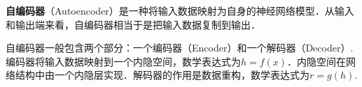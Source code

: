 
\textbf{自编码器}（Autoencoder）是一种将输入数据映射为自身的神经网络模型．从输入和输出端来看，自编码器相当于是把输入数据复制到输出．

自编码器一般包含两个部分：一个编码器（Encoder）和一个解码器（Decoder）.编码器将输入数据映射到一个内隐空间，数学表达式为$h=f(x)$．内隐空间在网络结构中由一个内隐层实现．解码器的作用是数据重构，数学表达式为$r=g(h)$.